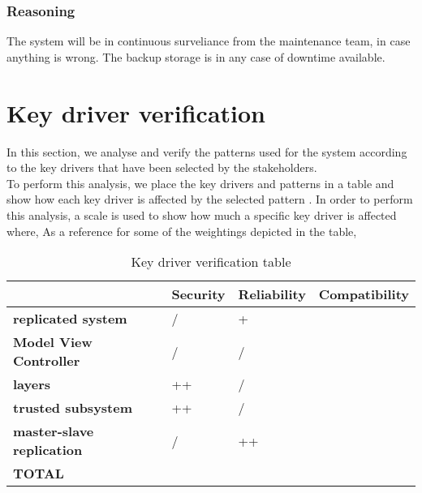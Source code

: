 \subsubsection{Reasoning}

The system will be in continuous surveliance from the maintenance team, in case anything is wrong. The backup storage is in any case of downtime available. 
\newpage


\section{Key driver verification}
In this section, we analyse and verify the patterns used for the system according to the key drivers that have been selected by the stakeholders.\\
To perform this analysis, we place the key drivers and patterns in a table and show how each key driver is affected by the selected pattern \cite{web:patterns-v-QAs} . In order to perform this analysis, a scale is used to show how much a specific key driver is affected where,
As a reference for some of the weightings depicted in the table, 

\begin{table}[H]
    \begin{tabularx}{\textwidth}{p{3.5cm}|>{\centering\arraybackslash}X|>{\centering\arraybackslash}X|>{\centering\arraybackslash}X}
    	 & \textbf{Security} & \textbf{Reliability} & \textbf{Compatibility} \\ \hline
    	\textbf{replicated system}         & /  & +  &  \\ \hline
    	\textbf{Model View Controller}  & /  & / &   \\ \hline
    	\textbf{layers}                    & ++ & /  &   \\ \hline
    	\textbf{trusted subsystem}         & ++ & /  &   \\ \hline
    	\textbf{master-slave replication}  & /  & ++ &   \\ \hline
	 \textbf{TOTAL} & \textbf{} & \textbf{} & \textbf{} \\
    \end{tabularx}
    \caption{Key driver verification table}
\end{table}